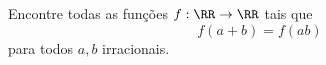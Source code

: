 Encontre todas as funções $f: \RR \to \RR$ tais que
$$f(a + b) = f(ab)$$
para todos $a, b$ irracionais.
